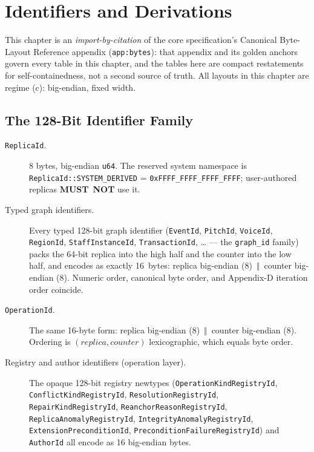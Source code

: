 \documentclass[11pt,letterpaper]{report}
\newcommand{\sectionsc}[1]{{\addfontfeatures{Letters=SmallCaps}#1}}
\newcommand{\MUSTNOT}{\textbf{MUST}\nobreak\ \textbf{NOT}}
\newcommand{\cat}{\ensuremath{\,\Vert\,}}
\newcommand{\ub}{\_\allowbreak}
\begin{document}
\chapter{Identifiers and Derivations}
\label{ch:ids}

This chapter is an \emph{import-by-citation} of the core specification's
\sectionsc{Canonical Byte-Layout Reference} appendix (\texttt{app:bytes}):
that appendix and its golden anchors govern every table in this chapter, and
the tables here are compact restatements for self-containedness, not a second
source of truth. All layouts in this chapter are regime (c): big-endian,
fixed width.

\section{The 128-Bit Identifier Family}
\label{sec:ids:family}

\begin{description}
  \item[\texttt{ReplicaId}.] 8 bytes, big-endian \texttt{u64}. The reserved
    system namespace is \texttt{ReplicaId::SYSTEM\ub DERIVED} =
    \texttt{0xFFFF\ub FFFF\ub FFFF\ub FFFF}; user-authored replicas
    \MUSTNOT{} use it.
  \item[Typed graph identifiers.] Every typed 128-bit graph identifier
    (\texttt{EventId}, \texttt{PitchId}, \texttt{VoiceId},
    \texttt{RegionId}, \texttt{StaffInstanceId}, \texttt{TransactionId},
    \ldots{} --- the \texttt{graph\_id} family) packs the 64-bit replica
    into the high half and the counter into the low half, and encodes as
    exactly 16~bytes: replica big-endian (8) \cat{} counter big-endian (8).
    Numeric order, canonical byte order, and Appendix-D iteration order
    coincide.
  \item[\texttt{OperationId}.] The same 16-byte form: replica big-endian (8)
    \cat{} counter big-endian (8). Ordering is $(\mathit{replica},
    \mathit{counter})$ lexicographic, which equals byte order.
  \item[Registry and author identifiers (operation layer).] The opaque
    128-bit registry newtypes (\texttt{OperationKind\allowbreak RegistryId},
    \texttt{ConflictKind\allowbreak RegistryId},
    \texttt{Resolution\allowbreak RegistryId},
    \texttt{RepairKind\allowbreak RegistryId},
    \texttt{ReanchorReason\allowbreak RegistryId},
    \texttt{ReplicaAnomaly\allowbreak RegistryId},
    \texttt{IntegrityAnomaly\allowbreak RegistryId},
    \texttt{Extension\allowbreak PreconditionId},
    \texttt{PreconditionFailure\allowbreak RegistryId}) and \texttt{AuthorId}
    all encode as 16 big-endian bytes.
\end{description}
\end{document}
